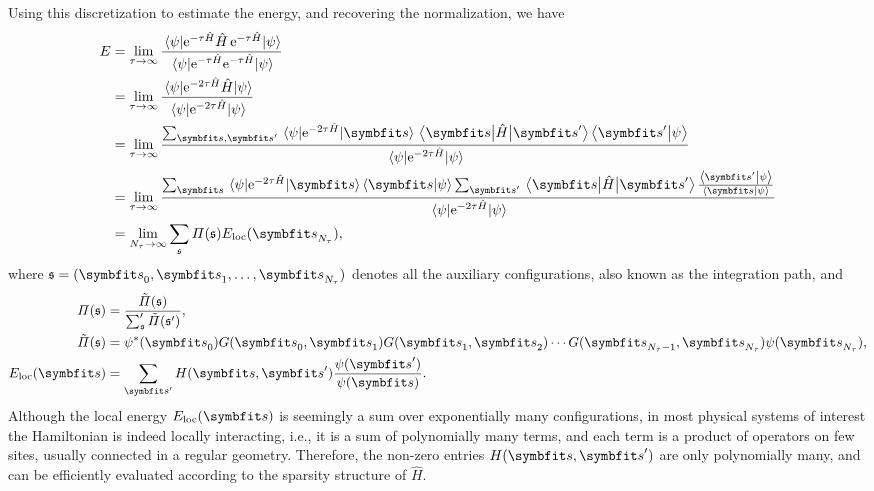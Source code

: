 Using this discretization to estimate the energy, and recovering the normalization, we have
\begin{align}
E &= \lim_{\tau \to \infty} \frac{\ev{\rme^{-\tau \hat{H}} \hat{H}\,\rme^{-\tau \hat{H}}}{\psiinit}}{\ev{\rme^{-\tau \hat{H}} \rme^{-\tau \hat{H}}}{\psiinit}} \\
&= \lim_{\tau \to \infty} \frac
{\ev{\rme^{-2 \tau \hat{H}} \hat{H}}{\psiinit}}
{\ev{\rme^{-2 \tau \hat{H}}}{\psiinit}} \label{eq:pimc-commute} \\
&= \lim_{\tau \to \infty} \frac
{\sum_{\vs, \vs'} \mel{\psiinit}{\rme^{-2 \tau \hat{H}}}{\vs} \mel{\vs}{\hat{H}}{\vs'} \ip{\vs'}{\psiinit}}
{\ev{\rme^{-2 \tau \hat{H}}}{\psiinit}} \\
&= \lim_{\tau \to \infty} \frac
{\sum_\vs \mel{\psiinit}{\rme^{-2 \tau \hat{H}}}{\vs} \ip{\vs}{\psiinit} \sum_{\vs'} \mel{\vs}{\hat{H}}{\vs'} \frac{\ip{\vs'}{\psiinit}}{\ip{\vs}{\psiinit}}}
{\ev{\rme^{-2 \tau \hat{H}}}{\psiinit}} \\
&= \lim_{N_\tau \to \infty} \sum_\svs \varPi(\svs) E_\text{loc}(\vs_{N_\tau}), \label{eq:pimc}
\end{align}
where $\svs = (\vs_0, \vs_1, \ldots, \vs_{N_\tau})$ denotes all the auxiliary configurations, also known as the integration path, and
\begin{align}
\varPi(\svs) &= \frac{\tilde{\varPi}(\svs)}{\sum_\svs' \tilde{\varPi}(\svs')}, \\
\tilde{\varPi}(\svs) &= \psiinit^*(\vs_0) G(\vs_0, \vs_1) G(\vs_1, \vs_2) \cdots G(\vs_{N_\tau - 1}, \vs_{N_\tau}) \psiinit(\vs_{N_\tau}), \label{eq:pimc-pi} \\
E_\text{loc}(\vs) &= \sum_{\vs'} H(\vs, \vs') \frac{\psiinit(\vs')}{\psiinit(\vs)}.
\end{align}
Although the local energy $E_\text{loc}(\vs)$ is seemingly a sum over exponentially many configurations, in most physical systems of interest the Hamiltonian is indeed locally interacting, i.e., it is a sum of polynomially many terms, and each term is a product of operators on few sites, usually connected in a regular geometry. Therefore, the non-zero entries $H(\vs, \vs')$ are only polynomially many, and can be efficiently evaluated according to the sparsity structure of $\hat{H}$.


